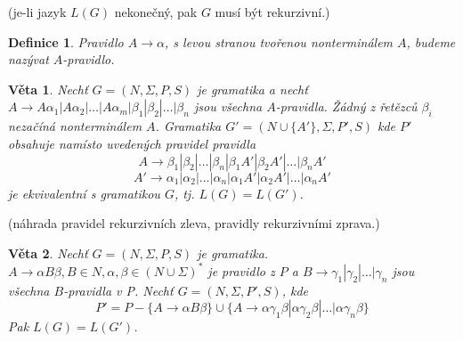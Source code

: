 \documentclass[a4paper, 11pt]{report}
\newtheorem{mydef}{Definice}[chapter]
\newtheorem{veta}{Věta}[chapter]
\begin{document}
(je-li jazyk $L(G)$ nekonečný, pak $G$ musí být rekurzivní.)

\begin{mydef}
Pravidlo $A \to \alpha$, s levou stranou tvořenou nonterminálem $A$, budeme nazývat $A$-pravidlo.
\end{mydef}

\begin{veta}
Nechť $G = (N, \Sigma, P, S)$ je gramatika a nechť $A \to A \alpha_1 | A \alpha_2 | \dots | A \alpha_m | \beta_1 | \beta_2 | \dots | \beta_n$ jsou všechna $A$-pravidla. Žádný z řetězců $\beta_i$ nezačíná nonterminálem $A$. Gramatika $G' = (N \cup \{A'\}, \Sigma, P', S)$ kde $P'$ obsahuje namísto uvedených pravidel pravidla
$$A \to \beta_1 | \beta_2 | \dots | \beta_n | \beta_1 A' | \beta_2 A' | \dots | \beta_n A' $$
$$A' \to \alpha_1 | \alpha_2 | \dots | \alpha_n | \alpha_1 A' | \alpha_2 A' | \dots | \alpha_n A' $$
je ekvivalentní s gramatikou $G$, tj. $L(G) = L(G')$.
\end{veta}
(náhrada pravidel rekurzivních zleva, pravidly rekurzivními zprava.)

\begin{veta}
Nechť $G = (N, \Sigma, P, S)$ je gramatika. $A \to \alpha B \beta, B \in N, \alpha, \beta \in (N \cup \Sigma)^*$ je pravidlo z $P$ a $B \to \gamma_1 | \gamma_2 | \dots | \gamma_n$ jsou všechna $B$-pravidla v P. Nechť $G = (N, \Sigma, P', S)$, kde
$$P' = P - \{A \to \alpha B \beta\} \cup \{A \to \alpha \gamma_1 \beta | \alpha \gamma_2 \beta | \dots | \alpha \gamma_n \beta\}$$
Pak $L(G) = L(G')$.
\end{veta}
\end{document}
